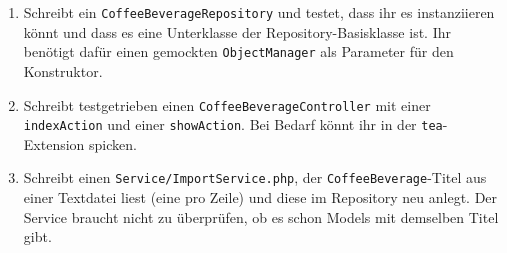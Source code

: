 \documentclass[a4paper,12pt]{scrartcl}
\begin{document}
\begin{enumerate}
  \item Schreibt ein \texttt{CoffeeBeverageRepository} und testet, dass ihr es instanziieren könnt und dass es eine Unterklasse der Repository-Basisklasse ist. Ihr benötigt dafür einen gemockten \texttt{ObjectManager} als Parameter für den Konstruktor.

  \item Schreibt testgetrieben einen \texttt{CoffeeBeverageController} mit einer \texttt{indexAction} und einer \texttt{showAction}. Bei Bedarf könnt ihr in der \texttt{tea}-Extension spicken.

  \item Schreibt einen \texttt{Service/ImportService.php}, der \texttt{CoffeeBeverage}-Titel aus einer Textdatei liest (eine pro Zeile) und diese im Repository neu anlegt. Der Service braucht nicht zu überprüfen, ob es schon Models mit demselben Titel gibt.

\end{enumerate}
\end{document}
